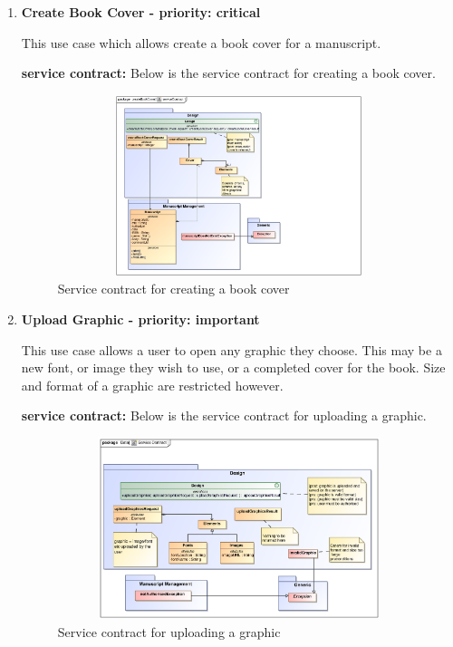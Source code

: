 \begin{enumerate}
\item \textbf{Create Book Cover - priority: critical}
\par{This use case which allows create a book cover for a  manuscript.}
\par{\textbf{service contract:} Below is the service contract for creating a book cover.
}
 \begin{figure}[h]
\includegraphics[height=200px, width=500px]{epsImages/Design/createBookCover.eps}
\caption{Service contract for creating a book cover}
\end{figure}

\item \textbf{Upload Graphic - priority: important}\\
\par{This use case allows a user to open any graphic they choose. This may be a new font, or image they wish to use, or a completed cover for the book. Size and format of a graphic are restricted however.}
\par{\textbf{service contract:} Below is the service contract for uploading a graphic.
}
\begin{figure}[h]
\includegraphics[height=200px, width=500px]{epsImages/Design/uploadGraphicsServiceContract.eps}
\caption{Service contract for uploading a graphic}
\end{figure}
\end{enumerate}
